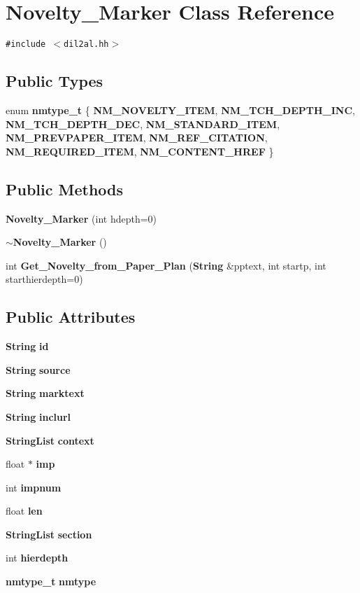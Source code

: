 \section{Novelty\_\-Marker  Class Reference}
\label{classNovelty__Marker}
{\tt \#include $<$dil2al.hh$>$}

\subsection*{Public Types}
\begin{CompactItemize}
\item 
enum {\bf nmtype\_\-t} \{ {\bf NM\_\-NOVELTY\_\-ITEM}, 
{\bf NM\_\-TCH\_\-DEPTH\_\-INC}, 
{\bf NM\_\-TCH\_\-DEPTH\_\-DEC}, 
{\bf NM\_\-STANDARD\_\-ITEM}, 
{\bf NM\_\-PREVPAPER\_\-ITEM}, 
{\bf NM\_\-REF\_\-CITATION}, 
{\bf NM\_\-REQUIRED\_\-ITEM}, 
{\bf NM\_\-CONTENT\_\-HREF}
 \}
\end{CompactItemize}
\subsection*{Public Methods}
\begin{CompactItemize}
\item 
{\bf Novelty\_\-Marker} (int hdepth=0)
\item 
{\bf $\sim$Novelty\_\-Marker} ()
\item 
int {\bf Get\_\-Novelty\_\-from\_\-Paper\_\-Plan} ({\bf String} \&pptext, int startp, int starthierdepth=0)
\end{CompactItemize}
\subsection*{Public Attributes}
\begin{CompactItemize}
\item 
{\bf String} {\bf id}
\item 
{\bf String} {\bf source}
\item 
{\bf String} {\bf marktext}
\item 
{\bf String} {\bf inclurl}
\item 
{\bf String\-List} {\bf context}
\item 
float $\ast$ {\bf imp}
\item 
int {\bf impnum}
\item 
float {\bf len}
\item 
{\bf String\-List} {\bf section}
\item 
int {\bf hierdepth}
\item 
{\bf nmtype\_\-t} {\bf nmtype}
\end{CompactItemize}


